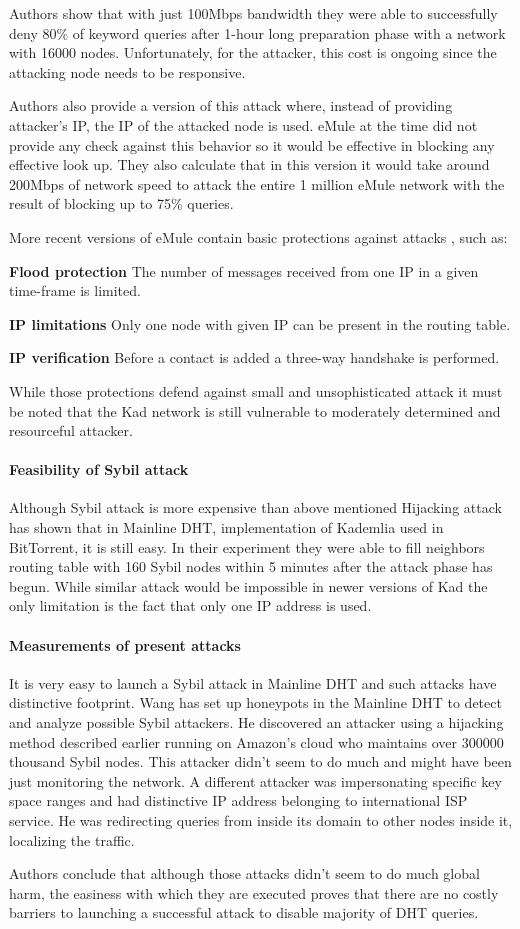 Authors show that with just 100Mbps bandwidth they were able to successfully
deny 80\% of keyword queries after 1-hour long preparation phase with a
network with 16000 nodes. Unfortunately, for the attacker, this cost is ongoing
since the attacking node needs to be responsive.

Authors also provide a version of this attack where, instead of providing
attacker's IP, the IP of the attacked node is used. eMule at the time did not
provide any check against this behavior so it would be effective in blocking
any effective look up. They also calculate that in this version it would take
around 200Mbps of network speed to attack the entire 1 million eMule network
with the result of blocking up to 75\% queries.

More recent versions of eMule contain basic protections against attacks
\cite{tim11}, such as:
\begin{description}
  \item{\textbf{Flood protection}} The number of messages received from one IP
    in a given time-frame is limited.
  \item{\textbf{IP limitations}} Only one node with given IP can be present in
    the routing table.
  \item{\textbf{IP verification}} Before a contact is added a three-way
    handshake is performed.
\end{description}

While those protections defend against small and unsophisticated attack it must
be noted that the Kad network is still vulnerable to moderately determined and
resourceful attacker.

\paragraph{Feasibility of Sybil attack}
Although Sybil attack is more expensive than above mentioned Hijacking attack
\cite{tim11} has shown that in Mainline DHT, implementation of Kademlia used in
BitTorrent, it is still easy. In their experiment they were able to fill
neighbors routing table with 160 Sybil nodes within 5 minutes after the attack
phase has begun. While similar attack would be impossible in newer versions of
Kad the only limitation is the fact that only one IP address is used.

\paragraph{Measurements of present attacks}
It is very easy to launch a Sybil attack in Mainline DHT and such attacks have
distinctive footprint. Wang \cite{wan12a} has set up honeypots in the Mainline
DHT to detect and analyze possible Sybil attackers. He discovered an attacker
using a hijacking method described earlier running on Amazon's cloud who
maintains over 300000 thousand Sybil nodes. This attacker didn't seem to do much
and might have been just monitoring the network. A different attacker was
impersonating specific key space ranges and had distinctive IP address belonging
to international ISP service. He was redirecting queries from inside its domain
to other nodes inside it, localizing the traffic.

Authors conclude that although those attacks didn't seem to do much global harm,
the easiness with which they are executed proves that there are no costly
barriers to launching a successful attack to disable majority of DHT queries.
